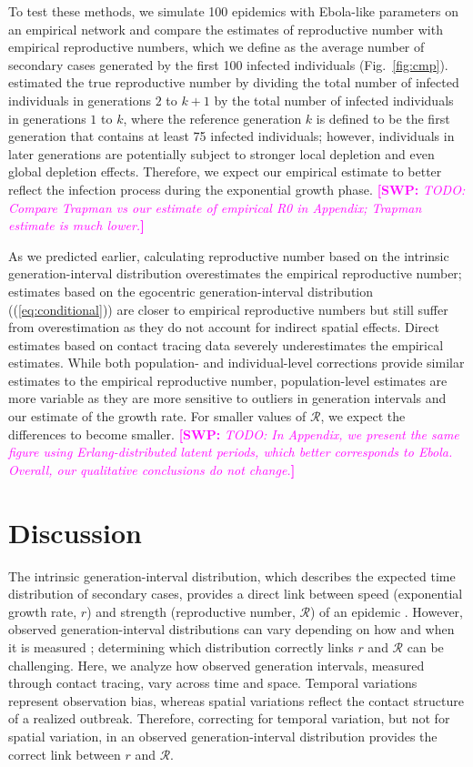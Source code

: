 \documentclass[12pt]{article}
\newcommand{\eref}[1]{(\ref{eq:#1})}
\newcommand{\fref}[1]{Fig.~\ref{fig:#1}}
\newcommand{\RR}{\ensuremath{{\mathcal R}}}
\newcommand{\comment}[3]{\textcolor{#1}{\textbf{[#2: }\textsl{#3}\textbf{]}}}
\newcommand{\swp}[1]{\comment{magenta}{SWP}{#1}}
\begin{document}
To test these methods, we simulate 100 epidemics with Ebola-like parameters on an empirical network \citep{leskovec2016snap} and compare the estimates of reproductive number with empirical reproductive numbers, which we define as the average number of secondary cases generated by the first 100 infected individuals (\fref{cmp}).
\cite{trapman2016inferring} estimated the true reproductive number by dividing the total number of infected individuals in generations $2$ to $k+1$ by the total number of infected individuals in generations $1$ to $k$, where the reference generation $k$ is defined to be the first generation that contains at least 75 infected individuals;
however, individuals in later generations are potentially subject to stronger local depletion and even global depletion effects.
Therefore, we expect our empirical estimate to better reflect the infection process during the exponential growth phase.
\swp{TODO: Compare Trapman vs our estimate of empirical R0 in Appendix; Trapman estimate is much lower.}

As we predicted earlier, calculating reproductive number based on the intrinsic generation-interval distribution overestimates the empirical reproductive number;
estimates based on the egocentric generation-interval distribution (\eref{conditional}) are closer to empirical reproductive numbers but still suffer from overestimation as they do not account for indirect spatial effects.
Direct estimates based on contact tracing data severely underestimates the empirical estimates.
While both population- and individual-level corrections provide similar estimates to the empirical reproductive number,
population-level estimates are more variable as they are more sensitive to outliers in generation intervals and our estimate of the growth rate.
For smaller values of \RR, we expect the differences to become smaller. 
\swp{TODO: In Appendix, we present the same figure using Erlang-distributed latent periods, which better corresponds to Ebola. Overall, our qualitative conclusions do not change.}

\section{Discussion}

The intrinsic generation-interval distribution, which describes the expected time distribution of secondary cases, provides a direct link between speed (exponential growth rate, $r$) and strength (reproductive number, $\RR$) of an epidemic \citep{wallinga2007generation, svensson2007note, svensson2015influence, park2019practical}.
However, observed generation-interval distributions can vary depending on how and when it is measured \citep{nishiura2010time, tomba2010some, champredon2015intrinsic, britton2019estimation};
determining which distribution correctly links $r$ and $\RR$ can be challenging.
Here, we analyze how observed generation intervals, measured through contact tracing, vary across time and space.
Temporal variations represent observation bias, whereas spatial variations reflect the contact structure of a realized outbreak.
Therefore, correcting for temporal variation, but not for spatial variation, in an observed generation-interval distribution provides the correct link between $r$ and $\RR$.
\end{document}
